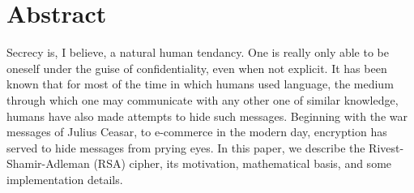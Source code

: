 \documentclass{article}
\begin{document}
    \section{Abstract}
        Secrecy is, I believe, a natural human tendancy.  One is really only able to be oneself under the guise of confidentiality, even when not explicit.%
        It has been known that for most of the time in which humans used language, the medium through which one may communicate with any other one of similar knowledge, humans have also made attempts to hide such messages.
        Beginning with the war messages of Julius Ceasar, to e-commerce in the modern day, encryption has served to hide messages from prying eyes.
        In this paper, we describe the Rivest-Shamir-Adleman (RSA) cipher, its motivation, mathematical basis, and some implementation details.
        
\end{document}
